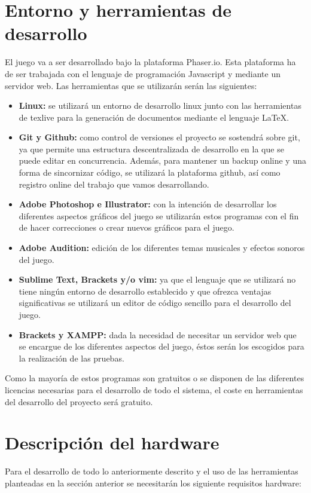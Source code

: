 \documentclass[palatino]{apuntes}
\begin{document}
\section {Entorno y herramientas de desarrollo}
El juego va a ser desarrollado bajo la plataforma Phaser.io. Esta plataforma ha de ser trabajada con el lenguaje de programación Javascript y mediante un servidor web. Las herramientas que se utilizarán serán las siguientes:

\begin{itemize}
	\item \textbf{Linux:} se utilizará un entorno de desarrollo linux junto con las herramientas de texlive para la generación de documentos mediante el lenguaje \LaTeX.
	\item \textbf{Git y Github:} como control de versiones el proyecto se sostendrá sobre git, ya que permite una estructura descentralizada de desarrollo en la que se puede editar en concurrencia. Además, para mantener un backup online y una forma de sincornizar código, se utilizará la plataforma github, así como registro online del trabajo que vamos desarrollando.
	\item \textbf{Adobe Photoshop e Illustrator:} con la intención de desarrollar los diferentes aspectos gráficos del juego se utilizarán estos programas con el fin de hacer correcciones o crear nuevos gráficos para el juego.
	\item \textbf{Adobe Audition:} edición de los diferentes temas musicales y efectos sonoros del juego.
	\item \textbf{Sublime Text, Brackets y/o vim:} ya que el lenguaje que se utilizará no tiene ningún entorno de desarrollo establecido y que ofrezca ventajas significativas se utilizará un editor de código sencillo para el desarrollo del juego.
	\item \textbf{Brackets y XAMPP:} dada la necesidad de necesitar un servidor web que se encargue de los diferentes aspectos del juego, éstos serán los escogidos para la realización de las pruebas.
\end{itemize}

Como la mayoría de estos programas son gratuitos o se disponen de las diferentes licencias necesarias para el desarrollo de todo el sistema, el coste en herramientas del desarrollo del proyecto será gratuito.


\section{Descripción del hardware}
Para el desarrollo de todo lo anteriormente descrito y el uso de las herramientas planteadas en la sección anterior se necesitarán los siguiente requisitos hardware:
\end{document}
